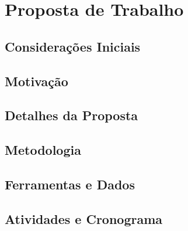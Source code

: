 \chapter{Proposta de Trabalho}
\label{cap-proposta}


\section{Considerações Iniciais}

\section{Motivação}

\section{Detalhes da Proposta}

\section{Metodologia}

\section{Ferramentas e Dados}

\section{Atividades e Cronograma}
%
